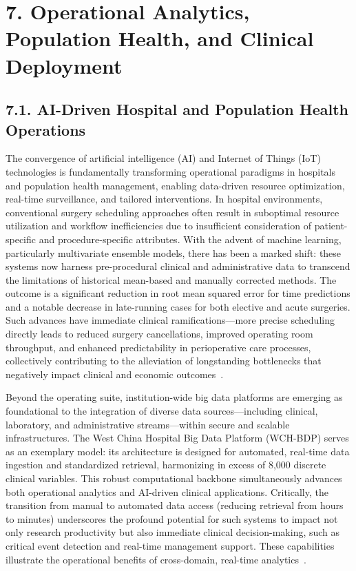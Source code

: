 \documentclass[11pt]{article}
\begin{document}
\section{7. Operational Analytics, Population Health, and Clinical Deployment}

\subsection{7.1. AI-Driven Hospital and Population Health Operations}

The convergence of artificial intelligence (AI) and Internet of Things (IoT) technologies is fundamentally transforming operational paradigms in hospitals and population health management, enabling data-driven resource optimization, real-time surveillance, and tailored interventions. In hospital environments, conventional surgery scheduling approaches often result in suboptimal resource utilization and workflow inefficiencies due to insufficient consideration of patient-specific and procedure-specific attributes. With the advent of machine learning, particularly multivariate ensemble models, there has been a marked shift: these systems now harness pre-procedural clinical and administrative data to transcend the limitations of historical mean-based and manually corrected methods. The outcome is a significant reduction in root mean squared error for time predictions and a notable decrease in late-running cases for both elective and acute surgeries. Such advances have immediate clinical ramifications—more precise scheduling directly leads to reduced surgery cancellations, improved operating room throughput, and enhanced predictability in perioperative care processes, collectively contributing to the alleviation of longstanding bottlenecks that negatively impact clinical and economic outcomes~\cite{ref81}.

Beyond the operating suite, institution-wide big data platforms are emerging as foundational to the integration of diverse data sources—including clinical, laboratory, and administrative streams—within secure and scalable infrastructures. The West China Hospital Big Data Platform (WCH-BDP) serves as an exemplary model: its architecture is designed for automated, real-time data ingestion and standardized retrieval, harmonizing in excess of 8,000 discrete clinical variables. This robust computational backbone simultaneously advances both operational analytics and AI-driven clinical applications. Critically, the transition from manual to automated data access (reducing retrieval from hours to minutes) underscores the profound potential for such systems to impact not only research productivity but also immediate clinical decision-making, such as critical event detection and real-time management support. These capabilities illustrate the operational benefits of cross-domain, real-time analytics~\cite{ref84}.
\end{document}
